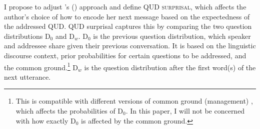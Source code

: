 \documentclass[output=paper,colorlinks,citecolor=brown]{langscibook}
\begin{document}
I propose to adjust \citeauthor{asr_demberg_2015}'s (\citeyear{asr_demberg_2015}) approach and define \textsc{QUD surprisal}, which affects the author's choice of how to encode her next message based on the expectedness of the addressed QUD. QUD surprisal captures this by comparing the two question distributions D$_{0}$ and D$_{w}$. D$_{0}$ is the previous question distribution, which speaker and addressee share given their previous conversation. It is based on the linguistic discourse context, prior probabilities for certain questions to be addressed, and the common ground.\footnote{This is compatible with different versions of common ground (management) \citep[e.g.,][]{chafe_1976,krifka_2008}, which affects the probabilities of D$_{0}$. In this paper, I will not be concerned with how exactly D$_{0}$ is affected by the common ground.} D$_{w}$ is the question distribution after the first word(s) of the next utterance.
\end{document}
